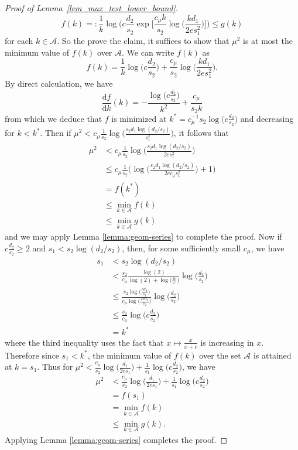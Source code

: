 \documentclass{article}
\newcommand{\D}{\textrm{d}}
\newcommand{\cA}{\mathcal{A}}
\theoremstyle{remark}
\begin{document}
\begin{proof}[Proof of Lemma~\ref{lem_max_test_lower_bound}]
    \[f(k) =: \frac{1}{k}\log\Bigg(c\frac{d_2}{s_2}\exp\Big[\frac{c_\mu k}{s_2}\log\big(\frac{kd_1}{2es_1^2}\big)\Big]\Bigg) \leq g(k)\]
    for each $k \in \cA$. So the prove the claim, it suffices to show that $\mu^2$ is at most the minimum value of $f(k)$ over $\cA$. We can write $f(k)$ as 
    \[f(k) = \frac{1}{k}\log\Big(c\frac{d_2}{s_2}\Big) + \frac{c_\mu}{s_2}\log\Big(\frac{kd_1}{2es_1^2}\Big).\]
    By direct calculation, we have
    \[\frac{\D f}{\D k}(k) = -\frac{\log\big(c\frac{d_2}{s_2}\big)}{k^2} + \frac{c_\mu}{s_2k}\]
    from which we deduce that $f$ is minimized at $k^* = c_\mu^{-1}s_2\log\big(c\frac{d_2}{s_2}\big)$ and decreasing for $k < k^*$. Then if $\mu^2 < c_\mu\frac{1}{s_2}\log\big(\frac{s_2d_1\log(d_2/s_2)}{s_1^2}\big)$, it follows that 
    \begin{align*}
        \mu^2 &< c_\mu\frac{1}{s_2}\log\big(\frac{s_2d_1\log(d_2/s_2)}{2es_1^2}\big) \\
        &\leq c_\mu\frac{1}{s_2}\Big(\log\big(\frac{s_2d_1\log(d_2/s_2)}{2e c_\mu s_1^2}\big) + 1\Big) \\
        &= f(k^*) \\
        &\leq \min_{k \in \cA}f(k) \\
        &\leq \min_{k\in \cA}g(k)
    \end{align*}
    and we may apply Lemma \ref{lemma:geom-series} to complete the proof. Now if $c\frac{d_2}{s_2} \geq 2$ and $s_1 < s_2\log(d_2/s_2)$, then, for some sufficiently small $c_\mu$, we have
    \begin{align*}
        s_1 &< s_2\log(d_2/s_2) \\
        &< \frac{s_2}{c_\mu}\frac{\log (2)}{\log (2) + \log \big(\frac{2e}{c}\big)}\log\big(\frac{d_2}{s_2}\big) \\
        &\leq \frac{s_2\log\big(\frac{cd_2}{s_2}\big)}{c_\mu\log\big(\frac{2ed_2}{s_2}\big)}\log\big(\frac{d_2}{s_2}\big) \\
        &\leq \frac{s_2}{c_\mu}\log\big(c\frac{d_2}{s_2}\big) \\
        &= k^*
    \end{align*}
    where the third inequality uses the fact that $x \mapsto \frac{x}{x + c}$ is increasing in $x$. Therefore since $s_1 < k^*$, the minimum value of $f(k)$ over the set $\cA$ is attained at $k = s_1$. Thus for $\mu^2 < \frac{c_\mu}{s_2}\log\big(\frac{d_1}{2es_1}\big) + \frac{1}{s_1}\log\big(c\frac{d_2}{s_2}\big)$, we have 
    \begin{align*}
        \mu^2 &< \frac{c_\mu}{s_2}\log\big(\frac{d_1}{2es_1}\big) + \frac{1}{s_1}\log\big(c\frac{d_2}{s_2}\big) \\ 
        &= f(s_1) \\
        &= \min_{k \in \cA}f(k) \\
        &\leq \min_{k\in \cA}g(k).
    \end{align*}
    Applying Lemma \ref{lemma:geom-series} completes the proof.    
\end{proof}
\end{document}
